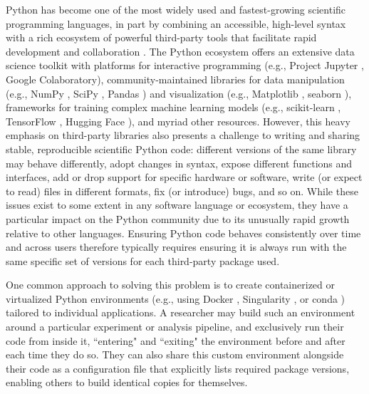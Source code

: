 \documentclass[preprint,12pt, a4paper]{elsarticle}
\begin{document}
Python \cite{vanR95} has become one of the most widely used and fastest-growing scientific programming languages, in part by combining an accessible, high-level syntax with a rich ecosystem of powerful third-party tools that facilitate rapid development and collaboration \cite{MullEtal15}.
The Python ecosystem offers an extensive data science toolkit with platforms for interactive programming (e.g., Project Jupyter \cite{KluyEtal16}, Google Colaboratory), community-maintained libraries for data manipulation (e.g., NumPy \cite{HarrEtal20}, SciPy \cite{VirtEtal20}, Pandas \cite{McKi10}) and visualization (e.g., Matplotlib \cite{Hunt07}, seaborn \cite{Wask21}), frameworks for training complex machine learning models (e.g., scikit-learn \cite{PedrEtal11}, TensorFlow \cite{AbadEtal15}, Hugging Face \cite{WolfEtal20}), and myriad other resources.
However, this heavy emphasis on third-party libraries also presents a challenge to writing and sharing stable, reproducible scientific Python code:
different versions of the same library may behave differently, adopt changes in syntax, expose different functions and interfaces, add or drop support for specific hardware or software, write (or expect to read) files in different formats, fix (or introduce) bugs, and so on.
While these issues exist to some extent in any software language or ecosystem, they have a particular impact on the Python community due to its unusually rapid growth relative to other languages.
Ensuring Python code behaves consistently over time and across users therefore typically requires ensuring it is always run with the same specific set of versions for each third-party package used.

One common approach to solving this problem is to create containerized or virtualized Python environments (e.g., using Docker \cite{Merk14}, Singularity \cite{KurtEtal17}, or conda \cite{Anac12}) tailored to individual applications.
A researcher may build such an environment around a particular experiment or analysis pipeline, and exclusively run their code from inside it, ``entering" and ``exiting" the environment before and after each time they do so.
They can also share this custom environment alongside their code as a configuration file that explicitly lists required package versions, enabling others to build identical copies for themselves.
\end{document}
